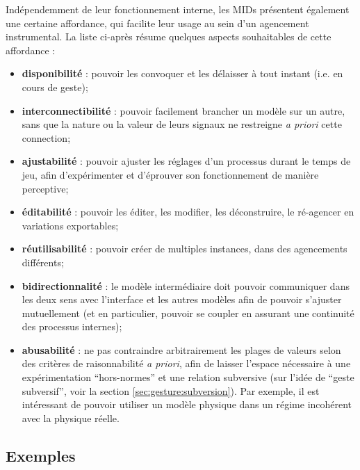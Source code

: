 \noindent Indépendemment de leur fonctionnement interne, les MIDs présentent également une certaine affordance, qui facilite leur usage au sein d'un agencement instrumental. La liste ci-après résume quelques aspects souhaitables de cette affordance :
\vspace{-1em}
\begin{itemize}[noitemsep]
	\item \textbf{disponibilité} : pouvoir les convoquer et les délaisser à tout instant (i.e. en cours de geste);
	\item \textbf{interconnectibilité} : pouvoir facilement brancher un modèle sur un autre, sans que la nature ou la valeur de leurs signaux ne restreigne \textit{a priori} cette connection;
	\item \textbf{ajustabilité} : pouvoir ajuster les réglages d'un processus durant le temps de jeu, afin d'expérimenter et d'éprouver son fonctionnement de manière perceptive;
	\item \textbf{éditabilité} : pouvoir les éditer, les modifier, les déconstruire, le ré-agencer en variations exportables;
	\item \textbf{réutilisabilité} : pouvoir créer de multiples instances, dans des agencements différents;
	\item \textbf{bidirectionnalité} : le modèle intermédiaire doit pouvoir communiquer dans les deux sens avec l'interface et les autres modèles afin de pouvoir s'ajuster mutuellement (et en particulier, pouvoir se coupler en assurant une continuité des processus internes);
	\item \textbf{abusabilité} : ne pas contraindre arbitrairement les plages de valeurs selon des critères de raisonnabilité \textit{a priori}, afin de laisser l'espace nécessaire à une expérimentation ``hors-normes'' et une relation subversive (sur l'idée de ``geste subversif'', voir la section \ref{sec:gesture:subversion}). Par exemple, il est intéressant de pouvoir utiliser un modèle physique dans un régime incohérent avec la physique réelle.
\end{itemize}

\subsection{Exemples}
\label{sec:algorithms:MID:examples}

